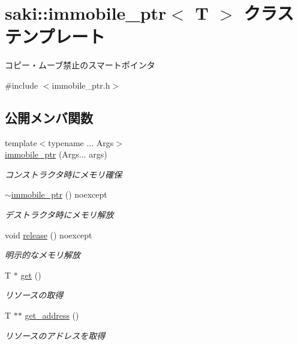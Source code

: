 \hypertarget{classsaki_1_1immobile__ptr}{}\section{saki\+:\+:immobile\+\_\+ptr$<$ T $>$ クラステンプレート}
\label{classsaki_1_1immobile__ptr}


コピー・ムーブ禁止のスマートポインタ  




{\ttfamily \#include $<$immobile\+\_\+ptr.\+h$>$}

\subsection*{公開メンバ関数}
\begin{DoxyCompactItemize}
\item 
{\footnotesize template$<$typename ... Args$>$ }\\\mbox{\hyperlink{classsaki_1_1immobile__ptr_aa64c721ab505396e3b7b75bb6916b562}{immobile\+\_\+ptr}} (Args... args)
\begin{DoxyCompactList}\small\item\em コンストラクタ時にメモリ確保 \end{DoxyCompactList}\item 
\mbox{\hyperlink{classsaki_1_1immobile__ptr_a7cb3ccfa2a366adfe164a0ba6c0f86d6}{$\sim$immobile\+\_\+ptr}} () noexcept
\begin{DoxyCompactList}\small\item\em デストラクタ時にメモリ解放 \end{DoxyCompactList}\item 
void \mbox{\hyperlink{classsaki_1_1immobile__ptr_a889ef4da216534edcf859d9da97e5955}{release}} () noexcept
\begin{DoxyCompactList}\small\item\em 明示的なメモリ解放 \end{DoxyCompactList}\item 
T $\ast$ \mbox{\hyperlink{classsaki_1_1immobile__ptr_a41956c8a6ba8fd9fb3cb092d94da5ea8}{get}} ()
\begin{DoxyCompactList}\small\item\em リソースの取得 \end{DoxyCompactList}\item 
T $\ast$$\ast$ \mbox{\hyperlink{classsaki_1_1immobile__ptr_a2d4f142600717223e0855d8a977e7429}{get\+\_\+address}} ()
\begin{DoxyCompactList}\small\item\em リソースのアドレスを取得 \end{DoxyCompactList}\item 
$$
\end{DoxyCompactItemize}
